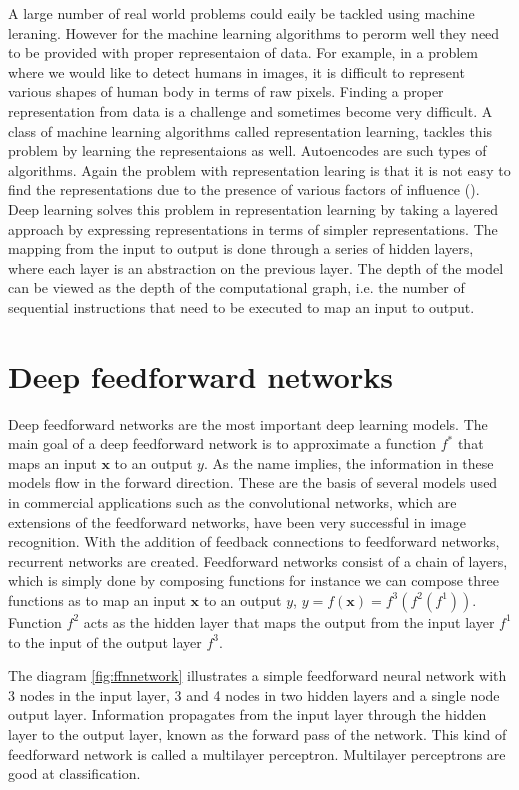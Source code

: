 A large number of real world problems could eaily be tackled using machine leraning. However for
the machine learning algorithms to perorm well they need to be provided with proper representaion
of data. For example, in a problem where we would like to detect humans in images, it is
difficult to represent various shapes of human body in terms of raw pixels. Finding a proper
representation from data is a challenge and sometimes become very difficult. A class of machine
learning algorithms called representation learning, tackles this problem by learning the
representaions as well. Autoencodes are such types of algorithms. Again the problem with
representation learing is that it is not easy to find the representations due to the presence of
various factors of influence (\citet{bengio2015deep}). Deep learning solves this problem in
representation learning by taking a layered approach by expressing representations in terms of
simpler representations. The mapping from the input to output is done through a series of hidden
layers, where each layer is an abstraction on the previous layer. The depth of the model can be
viewed as the depth of the computational graph, i.e. the number of sequential instructions that
need to be executed to map an input to output.

\section{Deep feedforward networks}
Deep feedforward networks are the most important deep learning models. The main goal of a deep
feedforward network is to approximate a function $f^{*}$ that maps an input $\textbf{x}$ to an
output $y$. As the name implies, the information in these models flow in the forward direction.
These are the basis of several models used in commercial applications such as the convolutional
networks, which are extensions of the feedforward networks, have been very successful in image
recognition. With the addition of feedback connections to feedforward networks, recurrent
networks are created. Feedforward networks consist of a chain of layers, which is simply done by
composing functions for instance we can compose three functions as to map an input $\textbf{x}$
to an output $y$, $y = f(\textbf{x}) = f^{3}(f^{2}(f^{1}))$. Function $f^{2}$ acts as the hidden
layer that maps the output from the input layer $f^{1}$ to the input of the output layer $f^{3}$.

The diagram \ref{fig:ffnnetwork} illustrates a simple feedforward neural network with 3 nodes in
the input layer, 3 and 4 nodes in two hidden layers and a single node output layer. Information
propagates from the input layer through the hidden layer to the output layer, known as the
forward pass of the network. This kind of feedforward network is called a multilayer perceptron.
Multilayer perceptrons are good at classification.

